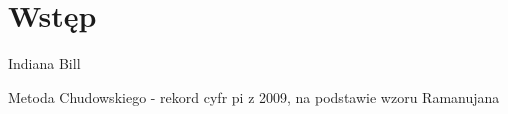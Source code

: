 \documentclass[11pt, wide, leqno]{mwart}
\begin{document}
\maketitle
\tableofcontents

\section{Wstęp}\label{sec:ws}

Indiana Bill

Metoda Chudowskiego - rekord cyfr pi z 2009, na podstawie wzoru Ramanujana









\koniec
\end{document}
